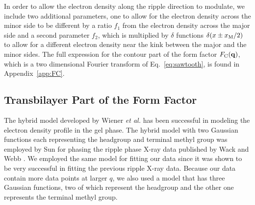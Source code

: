 In order to allow the electron density along the ripple direction to 
modulate, we include two additional parameters, one to allow for the electron
density across the minor side to be different by a ratio $f_1$ from the 
electron density across the major side and a second parameter $f_2$, which
is multiplied by $\delta$ functions $\delta(x \pm x_\textrm{M}/2)$ to allow for 
a different electron density near the kink between the major and the minor
sides. The full expression for the contour part of the form factor $F_\mathrm{C}(\mathbf{q})$,
which is a two dimensional Fourier transform of Eq.~\ref{eq:sawtooth},
is found in Appendix~\ref{app:FC}.

\subsection{Transbilayer Part of the Form Factor}\label{sec:transbilayer}
The hybrid model developed by Wiener \textit{et al.} \cite{ref:Wiener89} has
been successful in modeling the electron density profile in the gel phase.
The hybrid model with two Gaussian functions each representing the headgroup and
terminal methyl group was employed by Sun  \cite{ref:Sun96}
for phasing the ripple phase X-ray data published by Wack and Webb \cite{ref:Wack89}.
We employed the same model for fitting our data 
since it was shown to be very successful in fitting the previous ripple X-ray data.
Because our data contain more data points at larger $q$, we also used
a model that has three  Gaussian functions, two of which represent the headgroup 
and the other one represents the terminal methyl group. 

